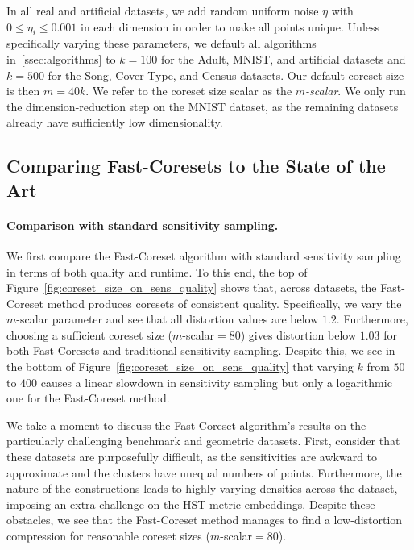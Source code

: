 In all real and artificial datasets, we add random uniform noise $\eta$ with $0 \leq \eta_i \leq 0.001$ in each dimension in order to make all points unique.
Unless specifically varying these parameters, we default all algorithms in~\ref{ssec:algorithms} to $k=100$ for the Adult, MNIST, and artificial datasets and
$k=500$ for the Song, Cover Type, and Census datasets. Our default coreset size is then $m = 40k$. We refer to the coreset size scalar as the \emph{$m$-scalar}.
We only run the dimension-reduction step on the MNIST dataset, as the remaining datasets already have sufficiently low dimensionality.


\subsection{Comparing Fast-Coresets to the State of the Art}
\label{ssec:alg_qualities}


\paragraph*{Comparison with standard sensitivity sampling.}



We first compare the Fast-Coreset algorithm with standard sensitivity sampling in terms of both quality and runtime.  To this end, the top of
Figure~\ref{fig:coreset_size_on_sens_quality} shows that, across datasets, the Fast-Coreset method produces coresets of consistent quality. Specifically, we
vary the $m$-scalar parameter and see that all distortion values are below $1.2$. Furthermore, choosing a sufficient coreset size ($m$-scalar$=80$) gives
distortion below $1.03$ for both Fast-Coresets and traditional sensitivity sampling. Despite this, we see in the bottom of
Figure~\ref{fig:coreset_size_on_sens_quality} that
varying $k$ from $50$ to $400$ causes a linear slowdown in sensitivity sampling but only a logarithmic one for the Fast-Coreset method.

We take a moment to discuss the Fast-Coreset algorithm's results on the particularly challenging benchmark and geometric datasets. First, consider that these
datasets are purposefully difficult, as the sensitivities are awkward to approximate and the clusters have unequal numbers of points.
Furthermore, the nature of the constructions leads to highly varying densities across the dataset, imposing an extra challenge on the HST metric-embeddings.
Despite these obstacles, we see that the Fast-Coreset method manages to find a low-distortion compression for reasonable coreset sizes ($m$-scalar$=80$).

